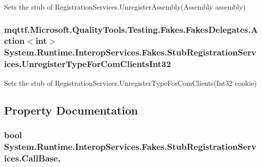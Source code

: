 Sets the stub of Registration\-Services.\-Unregister\-Assembly(\-Assembly assembly)

\hypertarget{class_system_1_1_runtime_1_1_interop_services_1_1_fakes_1_1_stub_registration_services_a374aa900089cbd1a0b6d73e211bfccd6}{
\subsubsection[{Unregister\-Type\-For\-Com\-Clients\-Int32}]{\setlength{\rightskip}{0pt plus 5cm}mqttf.\-Microsoft.\-Quality\-Tools.\-Testing.\-Fakes.\-Fakes\-Delegates.\-Action$<$int$>$ System.\-Runtime.\-Interop\-Services.\-Fakes.\-Stub\-Registration\-Services.\-Unregister\-Type\-For\-Com\-Clients\-Int32}}\label{class_system_1_1_runtime_1_1_interop_services_1_1_fakes_1_1_stub_registration_services_a374aa900089cbd1a0b6d73e211bfccd6}


Sets the stub of Registration\-Services.\-Unregister\-Type\-For\-Com\-Clients(\-Int32 cookie)



\subsection{Property Documentation}
\hypertarget{class_system_1_1_runtime_1_1_interop_services_1_1_fakes_1_1_stub_registration_services_afc80296ac69397d7ae53b21fcb2fc29c}{
\subsubsection[{Call\-Base}]{\setlength{\rightskip}{0pt plus 5cm}bool System.\-Runtime.\-Interop\-Services.\-Fakes.\-Stub\-Registration\-Services.\-Call\-Base\hspace{0.3cm}{\ttfamily [get]}, {\ttfamily [set]}}}\label{class_system_1_1_runtime_1_1_interop_services_1_1_fakes_1_1_stub_registration_services_afc80296ac69397d7ae53b21fcb2fc29c}


